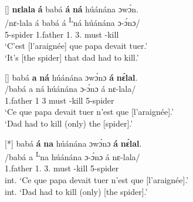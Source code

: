 \documentclass[output=paper,colorlinks,citecolor=brown
]{langscibook}
\begin{document}
\ea
\label{killspiderset}
\ea
[]{
\label{killspidercleft}
\glll
{\db}\textbf{nɛlala} \textbf{á} babá \textbf{á} \textbf{\ds{}ná} húánána ɔwɔ́n. \\ 
/nɛ-lala á babá á {\textsuperscript{L}ná} húánána ɔ-ɔ́nɔ/ \\
{\db}5-spider \COP{} 1.father 1\SM{}.\REL{} \PST{}3.\REL{} must \INF{}-kill \\
\glt
`C'est [l'araignée]\textsubscript{\FOC{}} que papa devait tuer.' \\ `It's [the spider]\textsubscript{\FOC{}} that dad had to kill.' \jambox*{[PM 70.61] }
}


\ex
[]{
\label{killspidervaomono}
\glll
{\db}babá \textbf{a} \textbf{ná} húánána ɔwɔ́nɔ \textbf{á} \textbf{nɛ́lal}. \\
/babá a ná húánána ɔ-ɔ́nɔ á nɛ-lala/ \\
{\db}1.father 1\SM{} \PST{}3{} must \INF{}-kill \CONTR{} 5-spider \\
\glt
`Ce que papa devait tuer n'est que [l'araignée]\textsubscript{\FOC{}}.' \\ `Dad had to kill (only) the [spider]\textsubscript{\FOC{}}.' \jambox*{[PM 70.57] }
}


\ex
[*]{
\label{killspidervaobi}
\glll
{\db}babá \textbf{á} \textbf{\ds{}na} húánána ɔwɔ́nɔ \textbf{á} \textbf{nɛ́lal}. \\
/babá a \textsuperscript{L}na húánána ɔ-ɔ́nɔ á nɛ-lala/ \\
{\db}1.father 1\SM{}.\REL{} \PST{}3.\REL{} must \INF{}-kill \CONTR{} 5-spider \\
\glt
int. `Ce que papa devait tuer n'est que [l'araignée]\textsubscript{\FOC{}}.' \\ int. `Dad had to kill (only) [the spider]\textsubscript{\FOC{}}.' \jambox*{[PM 70.62] }
}

\z
\z
\end{document}
